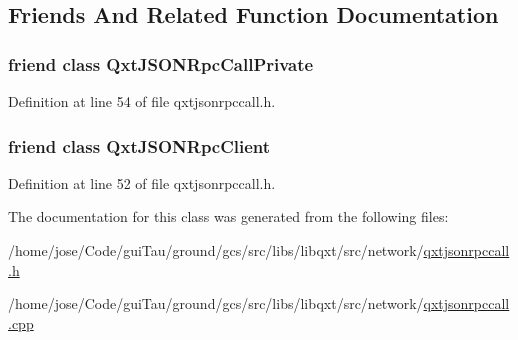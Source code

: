 \subsection{Friends And Related Function Documentation}
\hypertarget{class_qxt_j_s_o_n_rpc_call_a5d6a80473fb1d21c3aca6e0a8e7696ce}{
\subsubsection[{Qxt\-J\-S\-O\-N\-Rpc\-Call\-Private}]{\setlength{\rightskip}{0pt plus 5cm}friend class {\bf Qxt\-J\-S\-O\-N\-Rpc\-Call\-Private}\hspace{0.3cm}{\ttfamily [friend]}}}\label{class_qxt_j_s_o_n_rpc_call_a5d6a80473fb1d21c3aca6e0a8e7696ce}


Definition at line 54 of file qxtjsonrpccall.\-h.

\hypertarget{class_qxt_j_s_o_n_rpc_call_a728f2d6e1664e8cbe2c0838171b6e520}{
\subsubsection[{Qxt\-J\-S\-O\-N\-Rpc\-Client}]{\setlength{\rightskip}{0pt plus 5cm}friend class {\bf Qxt\-J\-S\-O\-N\-Rpc\-Client}\hspace{0.3cm}{\ttfamily [friend]}}}\label{class_qxt_j_s_o_n_rpc_call_a728f2d6e1664e8cbe2c0838171b6e520}


Definition at line 52 of file qxtjsonrpccall.\-h.



The documentation for this class was generated from the following files\-:\begin{DoxyCompactItemize}
\item 
/home/jose/\-Code/gui\-Tau/ground/gcs/src/libs/libqxt/src/network/\hyperlink{qxtjsonrpccall_8h}{qxtjsonrpccall.\-h}\item 
/home/jose/\-Code/gui\-Tau/ground/gcs/src/libs/libqxt/src/network/\hyperlink{qxtjsonrpccall_8cpp}{qxtjsonrpccall.\-cpp}\end{DoxyCompactItemize}
